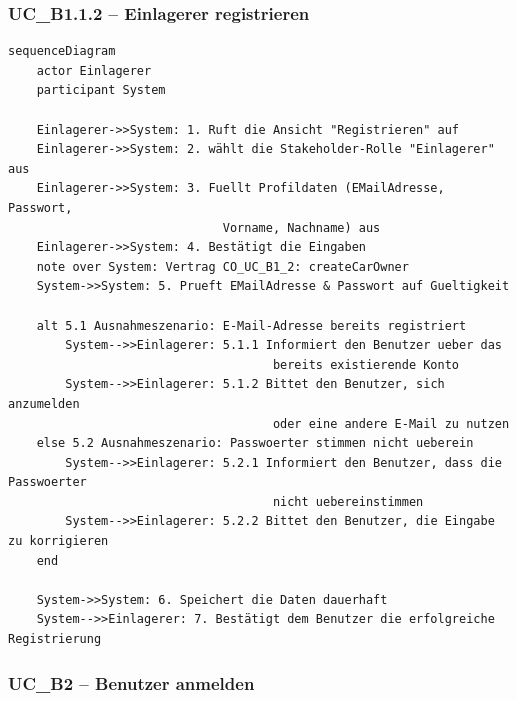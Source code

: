 \newpage

{}
\subsubsection*{UC\_B1.1.2 – Einlagerer registrieren}

\begin{lstlisting}[basicstyle=\ttfamily\small, breaklines=true]
sequenceDiagram
    actor Einlagerer
    participant System

    Einlagerer->>System: 1. Ruft die Ansicht "Registrieren" auf
    Einlagerer->>System: 2. wählt die Stakeholder-Rolle "Einlagerer" aus
    Einlagerer->>System: 3. Fuellt Profildaten (EMailAdresse, Passwort,
                              Vorname, Nachname) aus
    Einlagerer->>System: 4. Bestätigt die Eingaben
    note over System: Vertrag CO_UC_B1_2: createCarOwner
    System->>System: 5. Prueft EMailAdresse & Passwort auf Gueltigkeit

    alt 5.1 Ausnahmeszenario: E-Mail-Adresse bereits registriert
        System-->>Einlagerer: 5.1.1 Informiert den Benutzer ueber das
                                     bereits existierende Konto
        System-->>Einlagerer: 5.1.2 Bittet den Benutzer, sich anzumelden
                                     oder eine andere E-Mail zu nutzen
    else 5.2 Ausnahmeszenario: Passwoerter stimmen nicht ueberein
        System-->>Einlagerer: 5.2.1 Informiert den Benutzer, dass die Passwoerter
                                     nicht uebereinstimmen
        System-->>Einlagerer: 5.2.2 Bittet den Benutzer, die Eingabe zu korrigieren
    end

    System->>System: 6. Speichert die Daten dauerhaft
    System-->>Einlagerer: 7. Bestätigt dem Benutzer die erfolgreiche Registrierung
\end{lstlisting}

\newpage

{}
\subsubsection*{UC\_B2 – Benutzer anmelden}

